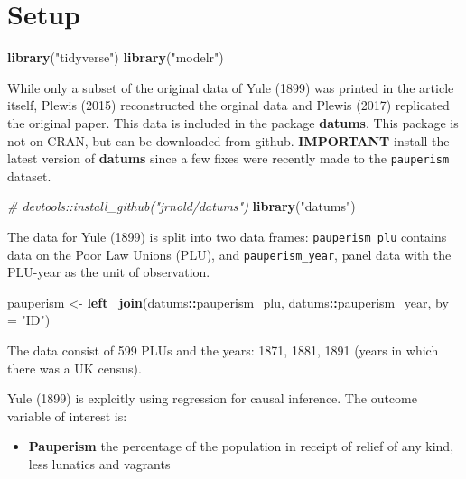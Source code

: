 \documentclass[]{article}
\newenvironment{Shaded}{\begin{snugshade}}{\end{snugshade}}
\newcommand{\KeywordTok}[1]{\textcolor[rgb]{0.13,0.29,0.53}{\textbf{#1}}}
\newcommand{\DataTypeTok}[1]{\textcolor[rgb]{0.13,0.29,0.53}{#1}}
\newcommand{\StringTok}[1]{\textcolor[rgb]{0.31,0.60,0.02}{#1}}
\newcommand{\CommentTok}[1]{\textcolor[rgb]{0.56,0.35,0.01}{\textit{#1}}}
\newcommand{\OperatorTok}[1]{\textcolor[rgb]{0.81,0.36,0.00}{\textbf{#1}}}
\newcommand{\NormalTok}[1]{#1}
\providecommand{\tightlist}{%
  \setlength{\itemsep}{0pt}\setlength{\parskip}{0pt}}
\begin{document}
\section{Setup}\label{setup}

\begin{Shaded}
\begin{Highlighting}[]
\KeywordTok{library}\NormalTok{(}\StringTok{"tidyverse"}\NormalTok{)}
\KeywordTok{library}\NormalTok{(}\StringTok{"modelr"}\NormalTok{)}
\end{Highlighting}
\end{Shaded}

While only a subset of the original data of Yule (1899) was printed in
the article itself, Plewis (2015) reconstructed the orginal data and
Plewis (2017) replicated the original paper. This data is included in
the package \textbf{datums}. This package is not on CRAN, but can be
downloaded from github. \textbf{IMPORTANT} install the latest version of
\textbf{datums} since a few fixes were recently made to the
\texttt{pauperism} dataset.

\begin{Shaded}
\begin{Highlighting}[]
\CommentTok{# devtools::install_github("jrnold/datums")}
\KeywordTok{library}\NormalTok{(}\StringTok{"datums"}\NormalTok{)}
\end{Highlighting}
\end{Shaded}

The data for Yule (1899) is split into two data frames:
\texttt{pauperism\_plu} contains data on the Poor Law Unions (PLU), and
\texttt{pauperism\_year}, panel data with the PLU-year as the unit of
observation.

\begin{Shaded}
\begin{Highlighting}[]
\NormalTok{pauperism <-}
\StringTok{  }\KeywordTok{left_join}\NormalTok{(datums}\OperatorTok{::}\NormalTok{pauperism_plu, datums}\OperatorTok{::}\NormalTok{pauperism_year,}
            \DataTypeTok{by =} \StringTok{"ID"}\NormalTok{)}
\end{Highlighting}
\end{Shaded}

The data consist of 599 PLUs and the years: 1871, 1881, 1891 (years in
which there was a UK census).

Yule (1899) is explcitly using regression for causal inference. The
outcome variable of interest is:

\begin{itemize}
\tightlist
\item
  \textbf{Pauperism} the percentage of the population in receipt of
  relief of any kind, less lunatics and vagrants
\end{itemize}
\end{document}
